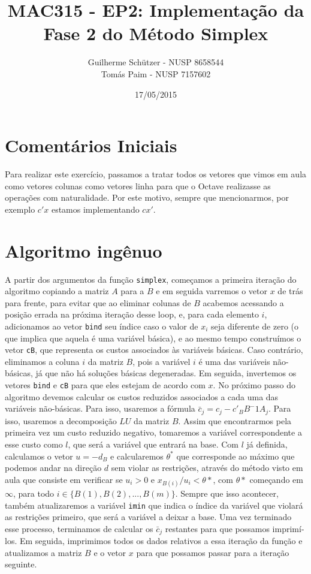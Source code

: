 \documentclass[a4paper]{article}
\title{MAC315 - EP2: Implementação da Fase 2 do Método Simplex}
\author{
	Guilherme Schützer - NUSP 8658544 \\
	Tomás Paim         - NUSP 7157602
}
\date{17/05/2015}
\begin{document}
\maketitle

\section{Comentários Iniciais}

Para realizar este exercício, passamos a tratar todos os vetores que vimos em aula como vetores colunas como vetores linha para que o Octave realizasse as operações com naturalidade. Por este motivo, sempre que mencionarmos, por exemplo $c'x$ estamos implementando $cx'$.

\section{Algoritmo ingênuo}


A partir dos argumentos da função \texttt{simplex}, começamos a primeira iteração do algoritmo copiando a matriz $A$ para a $B$ e em seguida varremos o vetor $x$ de trás para frente, para evitar que ao eliminar colunas de $B$ acabemos acessando a posição errada na próxima iteração desse loop, e, para cada elemento $i$, adicionamos ao vetor \texttt{bind} seu índice caso o valor de $x_{i}$ seja diferente de zero (o que implica que aquela é uma variável básica), e ao mesmo tempo construímos o vetor \texttt{cB}, que representa os custos associados às variáveis básicas. Caso contrário, eliminamos a coluna $i$ da matriz $B$, pois a variável $i$ é uma das variáveis não-básicas, já que não há soluções básicas degeneradas. Em seguida, invertemos os vetores \texttt{bind} e \texttt{cB} para que eles estejam de acordo com $x$.
No próximo passo do algoritmo devemos calcular os custos reduzidos associados a cada uma das variáveis não-básicas. Para isso, usaremos a fórmula \begin{math}\bar{c}_{j} = c_{j} - c'_{B}B^-1A_{j}\end{math}. Para isso, usaremos a decomposição $LU$ da matriz $B$.
Assim que encontrarmos pela primeira vez um custo reduzido negativo, tomaremos a variável correspondente a esse custo como $l$, que será a variável que entrará na base. Com $l$ já definida, calculamos o vetor $u = -d_{B}$ e calcularemos $\theta^*$ que corresponde ao máximo que podemos andar na direção $d$ sem violar as restrições, através do método visto em aula que consiste em verificar se $u_{i} > 0$ e $x_{B(i)}/u_{i} < \theta*$, com $\theta*$ começando em $\infty$, para todo $i \in \{B(1), B(2), ..., B(m)\}$. Sempre que isso acontecer, também atualizaremos a variável \texttt{imin} que indica o índice da variável que violará as restrições primeiro, que será a variável a deixar a base.
Uma vez terminado esse processo, terminamos de calcular os $\bar{c}_{j}$ restantes para que possamos imprimí-los.
Em seguida, imprimimos todos os dados relativos a essa iteração da função e atualizamos a matriz $B$ e o vetor $x$ para que possamos passar para a iteração seguinte.
\end{document}
